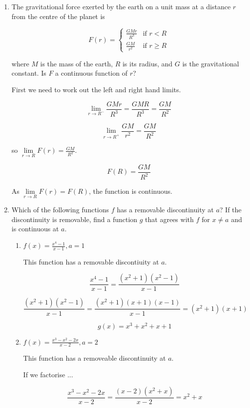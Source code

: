 \documentclass{article}
\begin{document}
\begin{enumerate}

			\item The gravitational force exerted by the earth on a unit mass at a distance $r$ from the
			centre of the planet is

				$$F(r) = 
					\begin{cases}
						\frac{GMr}{R^3} & \text{if } r < R \\
						\frac{GM}{r^2} & \text{if } r \geq R
					\end{cases}$$	

			where $M$ is the mass of the earth, $R$ is its radius, and $G$ is the gravitational constant.
			Is $F$ a continuous function of $r$?

			First we need to work out the left and right hand limits.

			$$\lim \limits _{r \to R^{-}} \frac{GMr}{R^3} = \frac{GMR}{R^3} = \frac{GM}{R^2}$$

			$$\lim \limits _{r \to R^{+}} \frac{GM}{r^2} = \frac{GM}{R^2}$$

			so $\lim \limits _{r \to R} F(r) = \frac{GM}{R^2}$.

			$$F(R) = \frac{GM}{R^2}$$

			As $\lim \limits _{r \to R} F(r) = F(R)$, the function is continuous.	

			\item Which of the following functions $f$ has a removable discontinuity at $a$?
				If the discontinuity is removable, find a function $g$ that agrees with $f$
				for $x \neq a$ and is continuous at $a$.

			\begin{enumerate}
				\item $f(x) = \frac{x^4 - 1}{x-1}, a = 1$
				
				This function has a removable discontiuity at $a$.

				$$\frac{x^4 - 1}{x-1} = \frac{(x^2 + 1)(x^2 - 1)}{x-1}$$

				$$\frac{(x^2+1)(x^2-1)}{x-1} = \frac{(x^2+1)(x+1)(x-1)}{x-1} = (x^2+1)(x+1)$$

				$$g(x) = x^3 + x^2 + x + 1$$ 

				\item $f(x) = \frac{x^3 - x^2 - 2x}{x-2}, a = 2$

				This function has a removeable discontinuity at $a$.

				If we factorise ...

				$$\frac{x^3 - x^2 - 2x}{x-2} = \frac{(x-2)(x^2 + x)}{x-2} = x^2 + x$$


\end{enumerate}
\end{enumerate}
\end{document}
